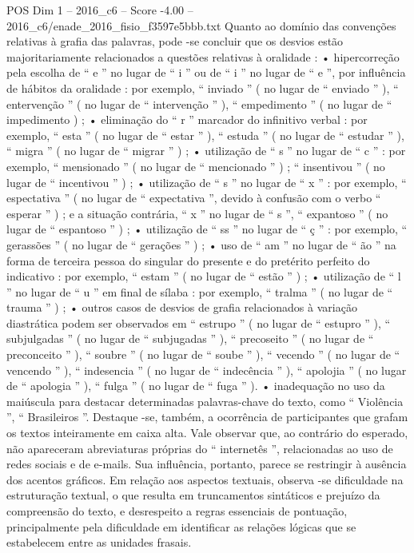 \begin{textsample}{POS Dim 1 – 2016\_c6 – Score -4.00 – 2016\_c6/enade\_2016\_fisio\_f3597e5bbb.txt}
Quanto ao domínio das convenções relativas à grafia das palavras, pode -se concluir que os desvios estão majoritariamente relacionados a questões relativas à oralidade : • hipercorreção pela escolha de “ e ” no lugar de “ i ” ou de “ i ” no lugar de “ e ”, por influência de hábitos da oralidade : por exemplo, “ inviado ” ( no lugar de “ enviado ” ), “ entervenção ” ( no lugar de “ intervenção ” ), “ empedimento ” ( no lugar de “ impedimento ) ; • eliminação do “ r ” marcador do infinitivo verbal : por exemplo, “ esta ” ( no lugar de “ estar ” ), “ estuda ” ( no lugar de “ estudar ” ), “ migra ” ( no lugar de “ migrar ” ) ; • utilização de “ s ” no lugar de “ c ” : por exemplo, “ mensionado ” ( no lugar de “ mencionado ” ) ; “ insentivou ” ( no lugar de “ incentivou ” ) ; • utilização de “ s ” no lugar de “ x ” : por exemplo, “ espectativa ” ( no lugar de “ expectativa ”, devido à confusão com o verbo “ esperar ” ) ; e a situação contrária, “ x ” no lugar de “ s ”, “ expantoso ” ( no lugar de “ espantoso ” ) ; • utilização de “ ss ” no lugar de “ ç ” : por exemplo, “ gerassões ” ( no lugar de “ gerações ” ) ; • uso de “ am ” no lugar de “ ão ” na forma de terceira pessoa do singular do presente e do pretérito perfeito do indicativo : por exemplo, “ estam ” ( no lugar de “ estão ” ) ; • utilização de “ l ” no lugar de “ u ” em final de sílaba : por exemplo, “ tralma ” ( no lugar de “ trauma ” ) ; • outros casos de desvios de grafia relacionados à variação diastrática podem ser observados em “ estrupo ” ( no lugar de “ estupro ” ), “ subjulgadas ” ( no lugar de “ subjugadas ” ), “ precoseito ” ( no lugar de “ preconceito ” ), “ soubre ” ( no lugar de “ soube ” ), “ vecendo ” ( no lugar de “ vencendo ” ), “ indesencia ” ( no lugar de “ indecência ” ), “ apolojia ” ( no lugar de “ apologia ” ), “ fulga ” ( no lugar de “ fuga ” ). • inadequação no uso da maiúscula para destacar determinadas palavras-chave do texto, como “ Violência ”, “ Brasileiros ”.
Destaque -se, também, a ocorrência de participantes que grafam os textos inteiramente em caixa alta.
Vale observar que, ao contrário do esperado, não apareceram abreviaturas próprias do “ internetês ”, relacionadas ao uso de redes sociais e de e-mails.
Sua influência, portanto, parece se restringir à ausência dos acentos gráficos.
Em relação aos aspectos textuais, observa -se dificuldade na estruturação textual, o que resulta em truncamentos sintáticos e prejuízo da compreensão do texto, e desrespeito a regras essenciais de pontuação, principalmente pela dificuldade em identificar as relações lógicas que se estabelecem entre as unidades frasais.

\end{textsample}
